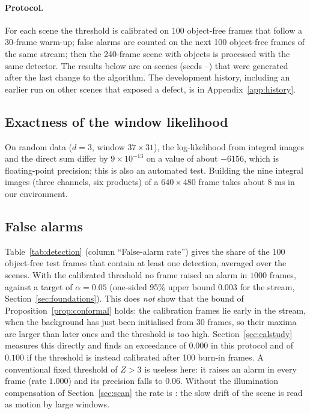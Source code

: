 \documentclass[11pt,a4paper]{article}
\theoremstyle{definition}
\begin{document}
\paragraph{Protocol.}
For each scene the threshold is calibrated on 100 object-free frames that follow a 30-frame warm-up; false alarms are counted on the next 100 object-free frames of the same stream; then the 240-frame scene with objects is processed with the same detector.
The results below are on \nSeeds{} scenes (seeds \seedLow--\seedHigh) that were generated after the last change to the algorithm.
The development history, including an earlier run on other scenes that exposed a defect, is in Appendix~\ref{app:history}.

\subsection{Exactness of the window likelihood}\label{sec:exactness}
On random data ($d=3$, window $37\times31$), the log-likelihood from integral images and the direct sum differ by $9\times10^{-13}$ on a value of about $-6156$, which is floating-point precision; this is also an automated test.
Building the nine integral images (three channels, six products) of a $640\times480$ frame takes about 8 ms in our environment.

\subsection{False alarms}\label{sec:false-alarms}
Table~\ref{tab:detection} (column ``False-alarm rate'') gives the share of the 100 object-free test frames that contain at least one detection, averaged over the \nSeeds{} scenes.
With the calibrated threshold no frame raised an alarm in $1000$ frames, against a target of $\alpha=0.05$ (one-sided 95\% upper bound $0.003$ for the stream, Section~\ref{sec:foundations}).
This does \emph{not} show that the bound of Proposition~\ref{prop:conformal} holds: the calibration frames lie early in the stream, when the background has just been initialised from 30 frames, so their maxima are larger than later ones and the threshold is too high. Section~\ref{sec:calstudy} measures this directly and finds an exceedance of $0.000$ in this protocol and of $0.100$ if the threshold is instead calibrated after 100 burn-in frames.
A conventional fixed threshold of $Z>3$ is useless here: it raises an alarm in every frame (rate $1.000$) and its precision falls to $0.06$.
Without the illumination compensation of Section~\ref{sec:scan} the rate is \faNoComp{}: the slow drift of the scene is read as motion by large windows.
\end{document}

